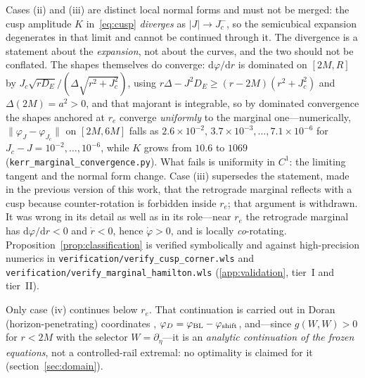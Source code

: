 \documentclass[12pt]{iopart}
\theoremstyle{plain}
\theoremstyle{definition}
\theoremstyle{remark}
\newcommand{\re}{r_{e}}
\newcommand{\Jc}{J_{c}}
\newcommand{\dd}{\mathrm{d}}
\begin{document}
Cases (ii) and (iii) are distinct local normal forms and must not be merged: the
cusp amplitude $K$ in~\eqref{eq:cusp} \emph{diverges} as $|J|\to\Jc^-$, so the
semicubical expansion degenerates in that limit and cannot be continued through
it. The divergence is a statement about the \emph{expansion}, not about the
curves, and the two should not be conflated. The shapes themselves do converge:
$\dd\varphi/\dd r$ is dominated on $[2M,R]$ by
$\Jc\sqrt{rD_E}/(\Delta\sqrt{r^2+\Jc^2})$, using
$r\Delta-J^2D_E\ge(r-2M)(r^2+\Jc^2)$ and $\Delta(2M)=a^2>0$, and that majorant is
integrable, so by dominated convergence the shapes anchored at $\re$ converge
\emph{uniformly} to the marginal one---numerically, $\|\varphi_J-\varphi_{\Jc}\|$ on
$[2M,6M]$ falls as $2.6\times10^{-2},\,3.7\times10^{-3},\dots,7.1\times10^{-6}$ for
$\Jc-J=10^{-2},\dots,10^{-6}$, while $K$ grows from $10.6$ to $1069$
(\texttt{kerr\_marginal\_convergence.py}). What fails is
uniformity in $C^1$: the limiting tangent and the normal form change. Case (iii)
supersedes the statement, made in the previous version of this work, that the
retrograde marginal reflects with a cusp because counter-rotation is forbidden
inside $\re$; that argument is withdrawn. It was wrong in its detail as well as
in its role---near $\re$ the retrograde marginal has $\dd\varphi/\dd r<0$ and
$\dot r<0$, hence $\dot\varphi>0$, and is locally \emph{co}-rotating.
Proposition~\ref{prop:classification} is verified symbolically and against
high-precision numerics in \texttt{verification/verify\_cusp\_corner.wls} and
\texttt{verification/verify\_marginal\_hamilton.wls}
(\ref{app:validation}, tier~I and tier~II).

Only case (iv) continues below $\re$. That continuation is carried out in Doran
(horizon-penetrating) coordinates
\cite{Doran2000,Natario2009,MartelPoisson2001},
$\varphi_D=\varphi_{\rm BL}-\varphi_{\rm shift}$, and---since $g(W,W)>0$ for
$r<2M$ with the selector $W=\partial_\eta$---it is an \emph{analytic
continuation of the frozen equations}, not a controlled-rail extremal: no
optimality is claimed for it (section~\ref{sec:domain}).
\end{document}
